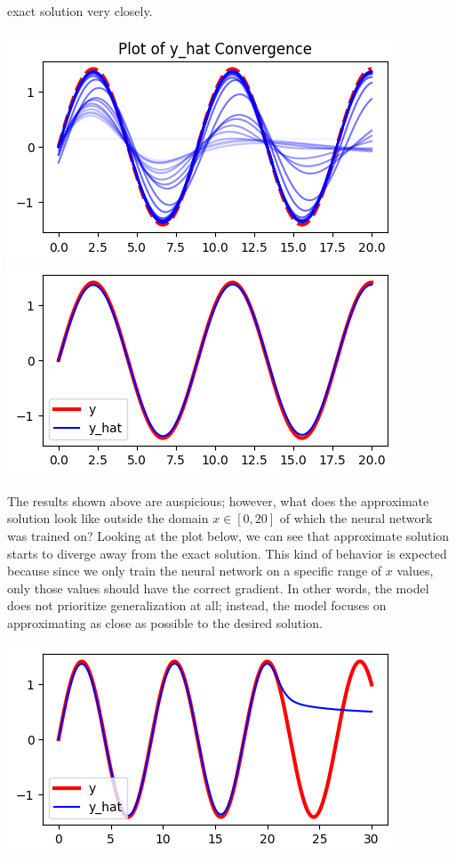 \documentclass[12pt]{article}
\begin{document}
\begin{description}
    exact solution very closely. \\
    \begin{minipage}{\linewidth}
        \centering
        \includegraphics[scale=.5]{images/figure10.png}
        \includegraphics[scale=.5]{images/figure11.png}
    \end{minipage}
    The results shown above are auspicious; however, what does the approximate
    solution look like outside the domain $x\in[0, 20]$ of which the neural
    network was trained on? Looking at the plot below, we can see that
    approximate solution starts to diverge away from the exact solution. This
    kind of behavior is expected because since we only train the neural network
    on a specific range of $x$ values, only those values should have the
    correct gradient. In other words, the model does not prioritize
    generalization at all; instead, the model focuses on approximating as close
    as possible to the desired solution. \\
    \begin{minipage}{\linewidth}
        \centering
        \includegraphics[scale=.5]{images/figure12.png}

\end{minipage}
\end{description}
\end{document}
